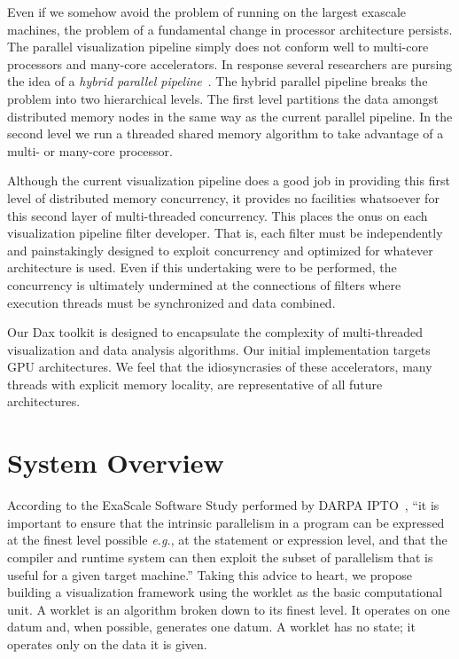 \documentclass{vgtc}                          %
\newcommand*{\lcite}[1]{~\cite{#1}}
\newcommand*{\keyterm}[1]{\emph{#1}}
\begin{document}
Even if we somehow avoid the problem of running on the largest exascale
machines, the problem of a fundamental change in processor architecture
persists.  The parallel visualization pipeline simply does not conform well
to multi-core processors and many-core accelerators.  In response several
researchers are pursing the idea of a \keyterm{hybrid parallel
  pipeline}\lcite{Camp10,Howison11,Li08}.  The hybrid parallel pipeline
breaks the problem into two hierarchical levels.  The first level
partitions the data amongst distributed memory nodes in the same way as the
current parallel pipeline.  In the second level we run a threaded shared
memory algorithm to take advantage of a multi- or many-core processor.

Although the current visualization pipeline does a good job in providing
this first level of distributed memory concurrency, it provides no
facilities whatsoever for this second layer of multi-threaded concurrency.
This places the onus on each visualization pipeline filter developer.  That
is, each filter must be independently and painstakingly designed to exploit
concurrency and optimized for whatever architecture is used.  Even if this
undertaking were to be performed, the concurrency is ultimately undermined
at the connections of filters where execution threads must be synchronized
and data combined.

Our Dax toolkit is designed to encapsulate the complexity of multi-threaded
visualization and data analysis algorithms.  Our initial implementation
targets GPU architectures.  We feel that the idiosyncrasies of these
accelerators, many threads with explicit memory locality, are
representative of all future architectures.

\section{System Overview}
\label{sec:SystemOverview}

According to the ExaScale Software Study performed by DARPA
IPTO\lcite{DARPAExascaleStudy}, ``it is important to ensure that the
intrinsic parallelism in a program can be expressed at the finest level
possible \emph{e.g.}, at the statement or expression level, and that the
compiler and runtime system can then exploit the subset of parallelism that
is useful for a given target machine.''  Taking this advice to heart, we
propose building a visualization framework using the worklet as the basic
computational unit.  A worklet is an algorithm broken down to its finest
level.  It operates on one datum and, when possible, generates one datum.
A worklet has no state; it operates only on the data it is given.
\end{document}
